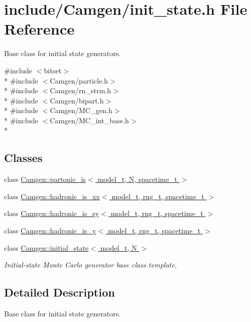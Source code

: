 \hypertarget{a00669}{}\section{include/\+Camgen/init\+\_\+state.h File Reference}
\label{a00669}


Base class for initial state generators.  


{\ttfamily \#include $<$bitset$>$}\\*
{\ttfamily \#include $<$Camgen/particle.\+h$>$}\\*
{\ttfamily \#include $<$Camgen/rn\+\_\+strm.\+h$>$}\\*
{\ttfamily \#include $<$Camgen/bipart.\+h$>$}\\*
{\ttfamily \#include $<$Camgen/\+M\+C\+\_\+gen.\+h$>$}\\*
{\ttfamily \#include $<$Camgen/\+M\+C\+\_\+int\+\_\+base.\+h$>$}\\*
\subsection*{Classes}
\begin{DoxyCompactItemize}
\item 
class \hyperlink{a00412}{Camgen\+::partonic\+\_\+is$<$ model\+\_\+t, N, spacetime\+\_\+t $>$}
\item 
class \hyperlink{a00260}{Camgen\+::hadronic\+\_\+is\+\_\+xx$<$ model\+\_\+t, rng\+\_\+t, spacetime\+\_\+t $>$}
\item 
class \hyperlink{a00258}{Camgen\+::hadronic\+\_\+is\+\_\+sy$<$ model\+\_\+t, rng\+\_\+t, spacetime\+\_\+t $>$}
\item 
class \hyperlink{a00262}{Camgen\+::hadronic\+\_\+is\+\_\+y$<$ model\+\_\+t, rng\+\_\+t, spacetime\+\_\+t $>$}
\item 
class \hyperlink{a00308}{Camgen\+::initial\+\_\+state$<$ model\+\_\+t, N $>$}
\begin{DoxyCompactList}\small\item\em Initial-\/state Monte Carlo generator base class template. \end{DoxyCompactList}\end{DoxyCompactItemize}


\subsection{Detailed Description}
Base class for initial state generators. 

